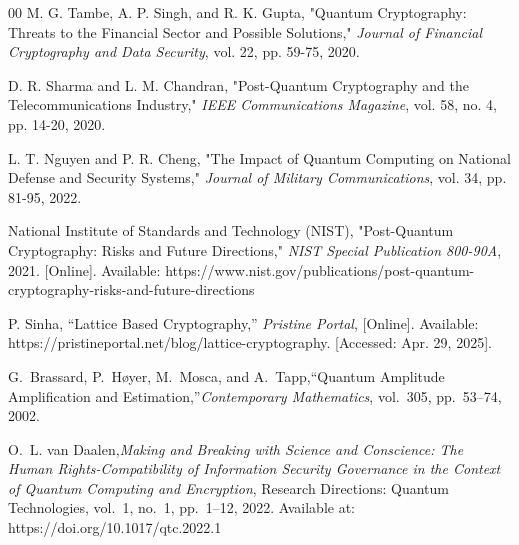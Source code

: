 \documentclass[conference]{IEEEtran}
\begin{document}
\begin{thebibliography}{00}
 M. G. Tambe, A. P. Singh, and R. K. Gupta, "Quantum Cryptography: Threats to the Financial Sector and Possible Solutions," \textit{Journal of Financial Cryptography and Data Security}, vol. 22, pp. 59-75, 2020.

 D. R. Sharma and L. M. Chandran, "Post-Quantum Cryptography and the Telecommunications Industry," \textit{IEEE Communications Magazine}, vol. 58, no. 4, pp. 14-20, 2020.

 L. T. Nguyen and P. R. Cheng, "The Impact of Quantum Computing on National Defense and Security Systems," \textit{Journal of Military Communications}, vol. 34, pp. 81-95, 2022.

 National Institute of Standards and Technology (NIST), "Post-Quantum Cryptography: Risks and Future Directions," \textit{NIST Special Publication 800-90A}, 2021. [Online]. Available: https://www.nist.gov/publications/post-quantum-cryptography-risks-and-future-directions

 P. Sinha, “Lattice Based Cryptography,” \textit{Pristine Portal}, [Online]. Available: https://pristineportal.net/blog/lattice-cryptography. [Accessed: Apr. 29, 2025].

G.~Brassard, P.~Høyer, M.~Mosca, and A.~Tapp,``Quantum Amplitude Amplification and Estimation,''\textit{Contemporary Mathematics}, vol.~305, pp.~53--74, 2002.

O.~L. van Daalen,\textit{Making and Breaking with Science and Conscience: The Human Rights-Compatibility of Information Security Governance in the Context of Quantum Computing and Encryption}, Research Directions: Quantum Technologies, vol.~1, no.~1, pp.~1--12, 2022. Available at: https://doi.org/10.1017/qtc.2022.1


\end{thebibliography}
\end{document}
